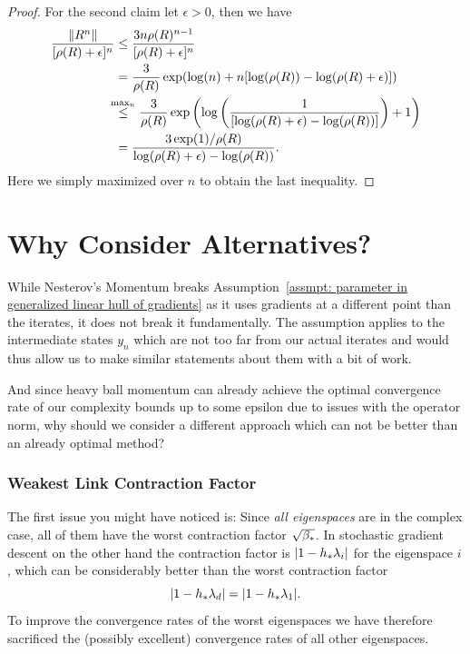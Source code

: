 \begin{proof}
	For the second claim let \(\epsilon>0\), then we have
	\begin{align*}
		\frac{\|R^n\|}{[\rho(R)+\epsilon]^n}
		&\le \frac{3n\rho(R)^{n-1}}{[\rho(R)+\epsilon]^n}\\
		&= \frac{3}{\rho(R)}\exp(\log(n) + n[\log(\rho(R))-\log(\rho(R)+\epsilon)])\\
		&\lxle{\max_n} \frac{3}{\rho(R)}\exp
		\left(\log\left(\frac{1}{[\log(\rho(R)+\epsilon)-\log(\rho(R))]}\right) + 1\right)\\
		&= \frac{3\exp(1)/\rho(R)}{\log(\rho(R)+\epsilon)-\log(\rho(R))}.
	\end{align*}
	Here we simply maximized over \(n\) to obtain the last inequality.
\end{proof}


\section{Why Consider Alternatives?}

While Nesterov's Momentum breaks Assumption~\ref{assmpt: parameter in
generalized linear hull of gradients} as it uses gradients at a
different point than the iterates, it does not break it fundamentally. The
assumption applies to the intermediate states \(y_n\) which are not too far
from our actual iterates and would thus allow us to make similar statements
about them with a bit of work.

And since heavy ball momentum can already achieve the optimal convergence
rate of our complexity bounds up to some epsilon due to issues with the operator
norm, why should we consider a different approach which can not be better than
an already optimal method?

\subsubsection{Weakest Link Contraction Factor}

The first issue you
might have noticed is: Since \emph{all eigenspaces} are in the complex case,
all of them have the worst contraction factor \(\sqrt{\beta_*}\). In stochastic
gradient descent on the other hand the contraction factor is \(|1-h_*\lambda_i|\)
for the eigenspace \(i\), which can be considerably better than the worst
contraction factor 
\[|1-h_*\lambda_d|=|1-h_*\lambda_1|.\]
To improve the convergence rates of the worst eigenspaces we have therefore
sacrificed the (possibly excellent) convergence rates of all other eigenspaces.

